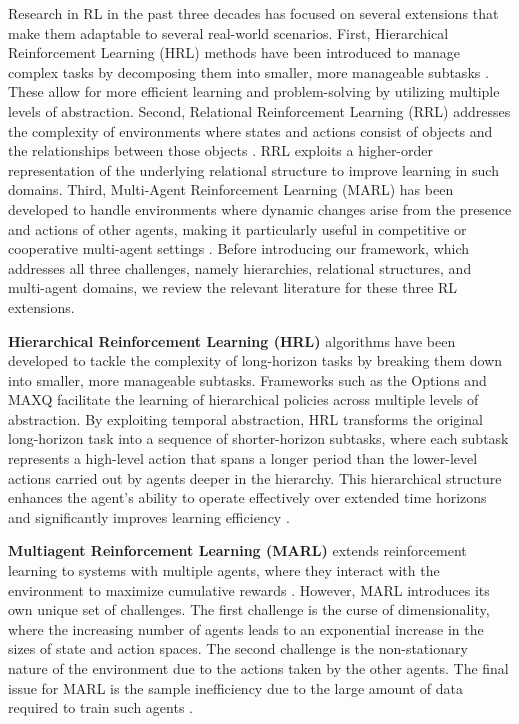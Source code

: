 Research in RL in the past three decades has focused on several extensions that make them adaptable to several real-world scenarios. First, Hierarchical Reinforcement Learning (HRL) methods have been introduced to manage complex tasks by decomposing them into smaller, more manageable subtasks \citep{hams}. These allow for more efficient learning and problem-solving by utilizing multiple levels of abstraction. Second, Relational Reinforcement Learning (RRL) addresses the complexity of environments where states and actions consist of objects and the relationships between those objects \citep{rrl}. RRL exploits a higher-order representation of the underlying relational structure to improve learning in such domains. Third, Multi-Agent Reinforcement Learning (MARL) has been developed to handle environments where dynamic changes arise from the presence and actions of other agents, making it particularly useful in competitive or cooperative multi-agent settings \citep{MARLBook}. Before introducing our framework, which addresses all three challenges, namely hierarchies, relational structures, and multi-agent domains, we review the relevant literature for these three RL extensions.

\textbf{Hierarchical Reinforcement Learning (HRL)} algorithms have been developed to tackle the complexity of long-horizon tasks by breaking them down into smaller, more manageable subtasks. Frameworks such as the Options  \citep{options} and MAXQ \citep{maxq} facilitate the learning of hierarchical policies across multiple levels of abstraction. By exploiting temporal abstraction, HRL transforms the original long-horizon task into a sequence of shorter-horizon subtasks, where each subtask represents a high-level action that spans a longer period than the lower-level actions carried out by agents deeper in the hierarchy. This hierarchical structure enhances the agent’s ability to operate effectively over extended time horizons and significantly improves learning efficiency \citep{hrl_survey}. %

\textbf{Multiagent Reinforcement Learning (MARL)} extends reinforcement learning to systems with multiple agents, where they interact with the environment to maximize cumulative rewards \citep{MARLBook}. However, MARL introduces its own unique set of challenges. The first challenge is the curse of dimensionality, where the increasing number of agents leads to an exponential increase in the sizes of state and action spaces. The second challenge is the non-stationary nature of the environment %
due to the actions taken by the other agents. The final issue for MARL is the sample inefficiency due to the large amount of data required to train such agents \citep{zhang2021multi}.


